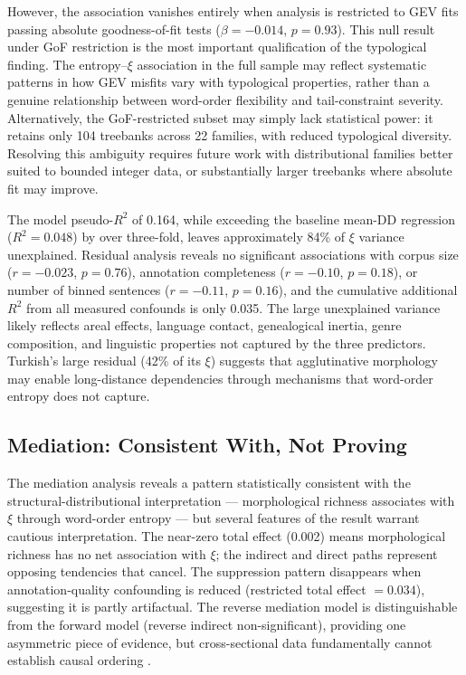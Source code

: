 \documentclass[11pt,letterpaper]{article}
\begin{document}
However, the association vanishes entirely when analysis is restricted to GEV fits passing absolute goodness-of-fit tests ($\beta = -0.014$, $p = 0.93$). This null result under GoF restriction is the most important qualification of the typological finding. The entropy--$\xi$ association in the full sample may reflect systematic patterns in how GEV misfits vary with typological properties, rather than a genuine relationship between word-order flexibility and tail-constraint severity. Alternatively, the GoF-restricted subset may simply lack statistical power: it retains only 104 treebanks across 22 families, with reduced typological diversity. Resolving this ambiguity requires future work with distributional families better suited to bounded integer data, or substantially larger treebanks where absolute fit may improve.

The model pseudo-$R^2$ of 0.164, while exceeding the baseline mean-DD regression ($R^2 = 0.048$) by over three-fold, leaves approximately 84\% of $\xi$ variance unexplained. Residual analysis reveals no significant associations with corpus size ($r = -0.023$, $p = 0.76$), annotation completeness ($r = -0.10$, $p = 0.18$), or number of binned sentences ($r = -0.11$, $p = 0.16$), and the cumulative additional $R^2$ from all measured confounds is only 0.035. The large unexplained variance likely reflects areal effects, language contact, genealogical inertia, genre composition, and linguistic properties not captured by the three predictors. Turkish's large residual (42\% of its $\xi$) suggests that agglutinative morphology may enable long-distance dependencies through mechanisms that word-order entropy does not capture.

\subsection{Mediation: Consistent With, Not Proving}

The mediation analysis reveals a pattern statistically consistent with the structural-distributional interpretation --- morphological richness associates with $\xi$ through word-order entropy --- but several features of the result warrant cautious interpretation. The near-zero total effect (0.002) means morphological richness has no net association with $\xi$; the indirect and direct paths represent opposing tendencies that cancel. The suppression pattern disappears when annotation-quality confounding is reduced (restricted total effect $= 0.034$), suggesting it is partly artifactual. The reverse mediation model is distinguishable from the forward model (reverse indirect non-significant), providing one asymmetric piece of evidence, but cross-sectional data fundamentally cannot establish causal ordering \cite{Maxwell2007}.
\end{document}
